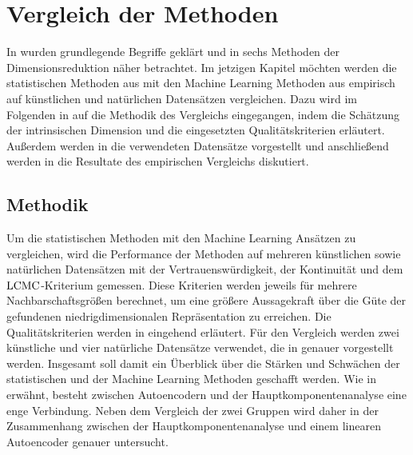 \chapter{Vergleich der Methoden}
\label{ch:Vergleich}

In  wurden grundlegende Begriffe geklärt und in
 sechs Methoden der Dimensionsreduktion näher betrachtet. Im jetzigen
Kapitel möchten werden die statistischen Methoden aus  mit
den Machine Learning Methoden aus  empirisch auf künstlichen
und natürlichen Datensätzen vergleichen. Dazu wird im Folgenden in
 auf die Methodik des Vergleichs eingegangen, indem die Schätzung
der intrinsischen Dimension und die eingesetzten Qualitätskriterien erläutert. Außerdem werden in
 die verwendeten Datensätze vorgestellt und
anschließend werden in  die Resultate des empirischen Vergleichs
diskutiert.

\section{Methodik}
\label{ch:Vergleich:sec:Methodik}

Um die statistischen Methoden mit den Machine Learning Ansätzen zu vergleichen, wird die
Performance der Methoden auf mehreren künstlichen sowie natürlichen Datensätzen mit der
Vertrauenswürdigkeit, der Kontinuität und dem $\operatorname{LCMC}$-Kriterium gemessen. Diese Kriterien werden
jeweils für mehrere Nachbarschaftsgrößen berechnet, um eine größere Aussagekraft über die Güte der
gefundenen niedrigdimensionalen Repräsentation zu erreichen. Die Qualitätskriterien werden in
 eingehend erläutert. Für den
Vergleich werden zwei künstliche und vier natürliche Datensätze verwendet, die in
 genauer vorgestellt werden. Insgesamt soll damit
ein Überblick über die Stärken und Schwächen der statistischen und der Machine Learning Methoden
geschafft werden. Wie in  erwähnt, besteht
zwischen Autoencodern und der Hauptkomponentenanalyse eine enge Verbindung. Neben dem Vergleich der
zwei Gruppen wird daher in  der Zusammenhang
zwischen der Hauptkomponentenanalyse und einem linearen Autoencoder genauer untersucht.

